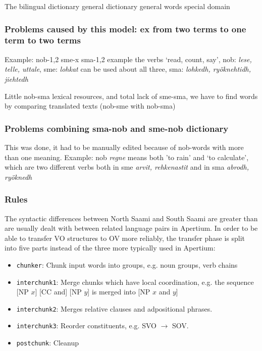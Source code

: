 \documentclass[a4paper,11pt,twocolumn]{article}
\begin{document}
The bilingual dictionary
general dictionary
general words
special domain

\subsubsection{Problems caused by this model: ex from two terms to one term to two terms}

Example: nob-1,2   sme-x   sma-1,2
example the verbs ‘read, count, say’, nob: \textit{lese, telle, uttale}, sme: \textit{lohkat} can be used about all three, sma: \textit{lohkedh, ryöknehtidh, jiehtedh} 

Little nob-sma lexical resources, and total lack of sme-sma, we have to find words by comparing translated texts (nob-sme with nob-sma)

\subsubsection{Problems combining sma-nob and sme-nob dictionary}
This was done, it had to be manually edited because of nob-words with more than one meaning. 
Example: nob \textit{regne} means both 'to rain' and ‘to calculate’, 
which are two different verbs both in sme \textit{arvit, rehkenastit} and in sma \textit{abrodh, ryöknedh}

\subsubsection{Rules}

The syntactic differences between North Saami and South Saami are
greater than are usually dealt with between related language pairs
in Apertium. 
In order to be able to transfer VO structures to OV more reliably,
the transfer phase is split into five parts instead of the three
more typically used in Apertium:



\begin{itemize} 
  \item \texttt{chunker}: Chunk input words into groups, e.g. noun groups, verb chains
  \item \texttt{interchunk1}: Merge chunks which have local coordination, e.g. the sequence [NP $x$] [CC and] [NP $y$] is merged into [NP $x$ and $y$]
  \item \texttt{interchunk2}: Merges relative clauses and adpositional phrases.
  \item \texttt{interchunk3}: Reorder constituents, e.g. SVO $\rightarrow$ SOV.
  \item \texttt{postchunk}: Cleanup
\end{itemize}
\end{document}
